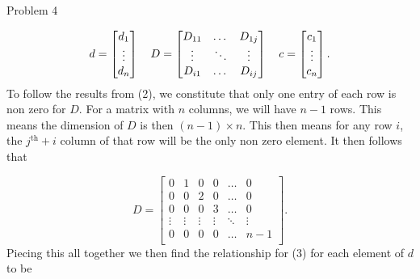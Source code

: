 \begin{problem}{Problem 4}
\begin{Highlight}[Solution]
        \begin{equation}
            d = 
            \begin{bmatrix}
                d_{1} \\
                \vdots \\
                d_{n} \\
            \end{bmatrix}
            \hspace*{10pt}
            D = 
            \begin{bmatrix}
                D_{11} & \dots & D_{1j} \\
                \vdots & \ddots & \vdots \\
                D_{i1} & \dots & D_{ij} \\
            \end{bmatrix}
            \hspace*{10pt}
            c = 
            \begin{bmatrix}
                c_{1} \\
                \vdots \\
                c_{n} \\
            \end{bmatrix}.
        \end{equation}
        To follow the results from (2), we constitute that only one entry of each row is non zero for $D$. For a matrix with $n$ columns, we will have $n - 1$ rows. This means the dimension of $D$ is 
        then $(n-1) \times n$. This then means for any row $i$, the $j^{\text{th}} + i$ column of that row will be the only non zero element. It then follows that

        \begin{equation}
            D = 
            \begin{bmatrix}
                0 & 1 & 0 & 0 & \dots & 0 \\
                0 & 0 & 2 & 0 & \dots & 0 \\
                0 & 0 & 0 & 3 & \dots & 0 \\
                \vdots & \vdots & \vdots & \vdots & \ddots & \vdots \\
                0 & 0 & 0 & 0 & \dots & n - 1 \\
            \end{bmatrix}.
        \end{equation}
        Piecing this all together we then find the relationship for (3) for each element of $d$ to be


\end{Highlight}
\end{problem}
